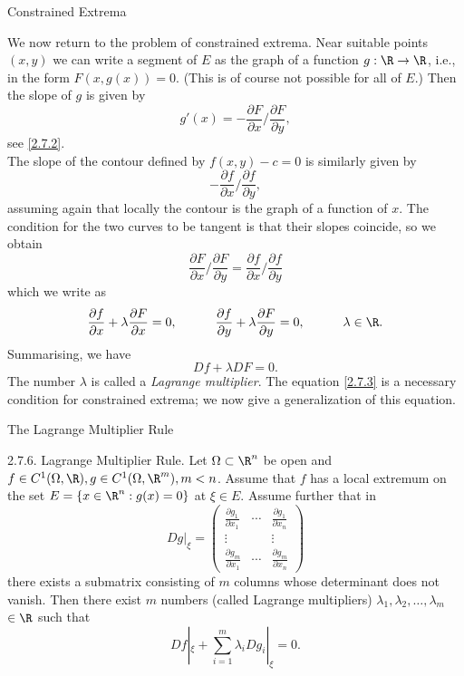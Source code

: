 \documentclass[smaller,hyperref={CJKbookmarks=true}]{beamer}
\newcommand{\myseries}[2]{$#1_1,#1_2,\dots,#1_#2$}
\begin{document}
\begin{frame}{Constrained Extrema}
\begin{spacing}{1.05}
We now return to the problem of constrained extrema. Near suitable
points $(x,y)$ we can write a segment of $E$ as the graph of a function $g:\R\to\R$, i.e., in the form $F(x,g(x))=0$. (This is of course not possible for all of $E$.) Then the slope of $g$ is given by\\[7pt]
\[g'(x)=-\frac{\partial F}{\partial x}/\frac{\partial F}{\partial y},\]
see \eqref{2.7.2}.\\[5pt]
The slope of the contour defined by $f(x,y)-c=0$ is similarly given by
\[-\frac{\partial f}{\partial x}/\frac{\partial f}{\partial y},\]
assuming again that locally the contour is the graph of a function of $x$.
\newpage
The condition for the two curves to be tangent is that their slopes
coincide, so we obtain
\[\frac{\partial F}{\partial x}/\frac{\partial F}{\partial y}=\frac{\partial f}{\partial x}/\frac{\partial f}{\partial y}\]
which we write as
\[\frac{\partial f}{\partial x}+\lambda\frac{\partial F}{\partial x}=0,\qquad\quad\frac{\partial f}{\partial y}+\lambda\frac{\partial F}{\partial y}=0,\qquad\quad\lambda\in\R.\]
Summarising, we have\\[8pt]
\begin{equation}\label{2.7.3}
  Df+\lambda DF=0.
\end{equation}
The number $\lambda$ is called a \emph{Lagrange multiplier}. The equation \eqref{2.7.3} is a necessary condition for constrained extrema; we now give a generalization of this equation.
\end{spacing}
\end{frame}
\begin{frame}[t]{The Lagrange Multiplier Rule}
\begin{spacing}{1.1}
\alert{2.7.6. Lagrange Multiplier Rule.} Let $\Omega\subset\R^n$ be open and $f\in C^1(\Omega,\R),g\in C^1(\Omega,\R^m),m<n$. Assume that $f$ has a local extremum on the set $E=\{x\in\R^n:g(x)=0\}$ at $\xi\in E$. Assume further that in
\[Dg|_\xi=\begin{pmatrix}
            \frac{\partial g_1}{\partial x_1} & \cdots & \frac{\partial g_1}{\partial x_n} \\
            \vdots &   & \vdots \\
            \frac{\partial g_m}{\partial x_1} & \cdots & \frac{\partial g_m}{\partial x_n}
          \end{pmatrix}\]
there exists a submatrix consisting of $m$ columns whose determinant does
not vanish. Then there exist $m$ numbers (called Lagrange multipliers) \myseries{\lambda}{m}$\in\R$ such that
\begin{equation}\label{2.7.4}
  Df|_\xi+\sum_{i=1}^{m}\lambda_i Dg_i|_\xi=0.
\end{equation}
\end{spacing}
\end{frame}
\end{document}
